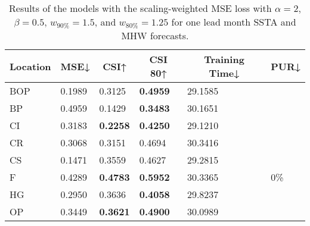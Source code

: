 \documentclass[11pt, a4paper]{article}
\begin{document}
\begin{table}[H]
\centering
\small
\caption{Results of the models with the scaling-weighted MSE loss with $\alpha=2$, $\beta=0.5$, $w_{90\%}=1.5$, and $w_{80\%}=1.25$ for one lead month SSTA and MHW forecasts.}\label{tb:swmse2}
\begin{tabular}{llllll}
\multicolumn{1}{c}{\textbf{Location}} & \multicolumn{1}{c}{\textbf{MSE↓}} & \multicolumn{1}{c}{\textbf{CSI↑}} & \multicolumn{1}{c}{\textbf{CSI 80↑}} & \multicolumn{1}{c}{\textbf{Training Time↓}} & \multicolumn{1}{c}{\textbf{PUR↓}} \\ \hline
BOP                         & 0.1989                            & 0.3125                            & \textbf{0.4959}                      & 29.1585                                     &                                   \\
BP                        & 0.4959                            & 0.1429                            & \textbf{0.3483}                      & 30.1651                                     &                                   \\
CI                        & 0.3183                            & \textbf{0.2258}                   & \textbf{0.4250}                      & 29.1210                                     &                                   \\
CR                           & 0.3068                            & 0.3151                            & 0.4694                               & 30.3416                                     &                                   \\
CS                           & 0.1471                            & 0.3559                            & 0.4627                               & 29.2815                                     &                                   \\
F                             & 0.4289                            & \textbf{0.4783}                   & \textbf{0.5952}                      & 30.3365                                     & 0\%                               \\
HG                          & 0.2950                            & 0.3636                            & \textbf{0.4058}                      & 29.8237                                     &                                   \\
OP                       & 0.3449                            & \textbf{0.3621}                   & \textbf{0.4900}                      & 30.0989                                     &                                   \\

\end{tabular}
\end{table}
\end{document}
